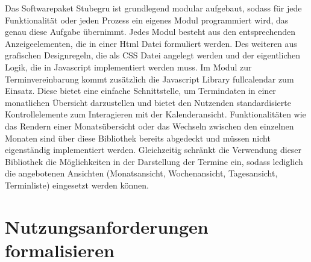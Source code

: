 Das Softwarepaket Stubegru ist grundlegend modular aufgebaut, sodass für jede
Funktionalität oder jeden Prozess ein eigenes Modul programmiert wird, das
genau diese Aufgabe übernimmt. Jedes Modul besteht aus den entsprechenden
Anzeigeelementen, die in einer Html Datei formuliert werden. Des weiteren aus
grafischen Designregeln, die als CSS Datei angelegt werden und der eigentlichen
Logik, die in Javascript implementiert werden muss. Im Modul zur
Terminvereinbarung kommt zusätzlich die Javascript Library \gls{fullcalendar}
zum Einsatz. Diese bietet eine einfache Schnittstelle, um Termindaten in einer
monatlichen Übersicht darzustellen und bietet den Nutzenden standardisierte
Kontrollelemente zum Interagieren mit der Kalenderansicht. Funktionalitäten wie
das Rendern einer Monatsübersicht oder das Wechseln zwischen den einzelnen
Monaten sind über diese Bibliothek bereits abgedeckt und müssen nicht
eigenständig implementiert werden. Gleichzeitig schränkt die Verwendung dieser
Bibliothek die Möglichkeiten in der Darstellung der Termine ein, sodass
lediglich die angebotenen Ansichten (Monatsansicht, Wochenansicht,
Tagesansicht, Terminliste) eingesetzt werden können.

\section{Nutzungsanforderungen formalisieren}
\label{subsection:sequenceDiagrams}

